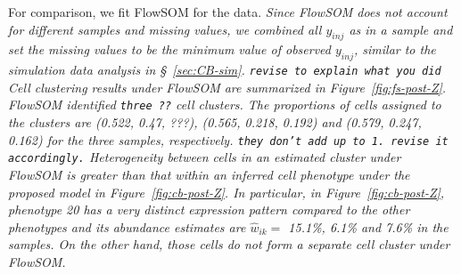 \documentclass[12pt,]{article}
\newcommand{\ech}{\color{Black}\rm}
\newcommand{\hh}{\color{Mahogany}\it}
\begin{document}
For comparison, we fit FlowSOM for the data. \hh Since FlowSOM does not account
for different samples and missing values, we combined all $y_{inj}$ as in a
sample and  set the missing values to be the minimum value of observed
$y_{inj}$, similar to the simulation data analysis in \S~\ref{sec:CB-sim}.
%
{\tt revise to explain what you did} \ech
%
Cell clustering results under FlowSOM are summarized in
Figure~\ref{fig:fs-post-Z}.  FlowSOM identified {\tt three ??} cell clusters.
The proportions of cells assigned to the clusters are (0.522, 0.47, ???),
(0.565, 0.218, 0.192) and (0.579, 0.247, 0.162) for the three samples,
respectively.  {\tt they don't add up to 1.  revise it accordingly.}
Heterogeneity between cells in an estimated cluster under FlowSOM is greater
than that within an inferred cell phenotype under the proposed model in
Figure~\ref{fig:cb-post-Z}.  In particular, in Figure~\ref{fig:cb-post-Z},
phenotype 20 has a very distinct expression pattern compared to the other
phenotypes and its abundance estimates are $\hat{w}_{ik}=$ 15.1\%, 6.1\% and
7.6\% in the samples. On the other hand, those cells do not form a separate
cell cluster under FlowSOM.   


%










\end{document}
